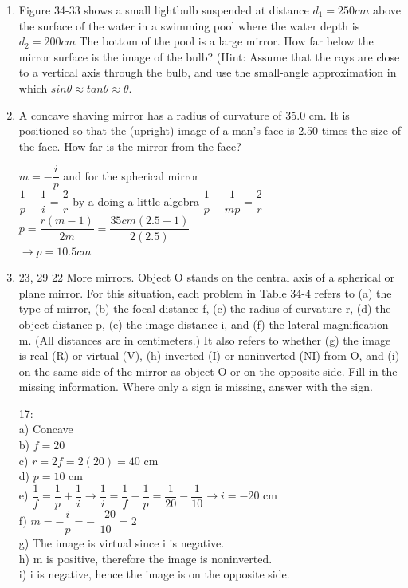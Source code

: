 \documentclass[fleqn]{article}
\begin{document}
  \begin{enumerate}
    \item Figure 34-33 shows a small lightbulb suspended at distance $d_1=250 cm$ above the surface of the water in a swimming pool where the water depth is $d_2=200 cm$ The bottom of the pool is a large mirror. How far below the mirror surface is the image of the bulb? (Hint: Assume that the rays are close to a vertical axis through the bulb, and use the small-angle approximation in which $sin\theta \approx tan \theta \approx \theta $.

    \item A concave shaving mirror has a radius of curvature of 35.0 cm. It is positioned so that the (upright) image of a man’s face is 2.50 times the size of the face. How far is the mirror from the face?

      \textcolor{hwColor}{
        $
          m=-\dfrac{i}{p}
        $ 
        and for the spherical mirror
        \\
        $
          \dfrac{1}{p}+\dfrac{1}{i}=\dfrac{2}{r}
        $ 
        by a doing a little algebra
        $
          \dfrac{1}{p}-\dfrac{1}{mp}=\dfrac{2}{r}
        $
        \\
        $
          p=\dfrac{r(m-1)}{2m}=\dfrac{35 cm(2.5-1)}{2(2.5)}
        $
        \\
        $
          \rightarrow p=10.5 cm
        $
      }

    \item 23, 29 22 More mirrors. Object O stands on the central axis of a spherical or plane mirror. For this situation, each problem in Table 34-4 refers to (a) the type of mirror, (b) the focal distance f, (c) the radius of curvature r, (d) the object distance p, (e) the image distance i, and (f) the lateral magnification m. (All distances are in centimeters.) It also refers to whether (g) the image is real (R) or virtual (V), (h) inverted (I) or noninverted (NI) from O, and (i) on the same side of the mirror as object O or on the opposite side. Fill in the missing information. Where only a sign is missing, answer with the sign.
    
    \textcolor{hwColor}{
      17:  \\
      a) Concave \\
      b) $f=20$ \\
      c) $r=2f=2(20)=40$ cm \\
      d) $p=10$ cm \\
      e) $\dfrac{1}{f}=\dfrac{1}{p}+\dfrac{1}{i} \rightarrow \dfrac{1}{i}=\dfrac{1}{f}-\dfrac{1}{p}=\dfrac{1}{20}-\dfrac{1}{10} \rightarrow i=-20$ cm \\
      f) $m=-\dfrac{i}{p}=-\dfrac{-20}{10}=2$ \\
      g) The image is virtual since i is negative. \\
      h) m is positive, therefore the image is noninverted. \\
      i) i is negative, hence the image is on the opposite side. \\
    }


\end{enumerate}
\end{document}
